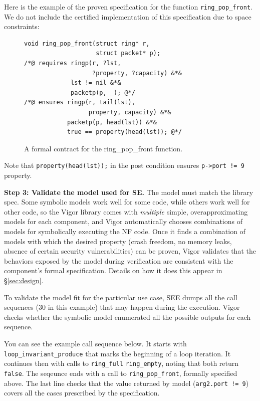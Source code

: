 \documentclass[letterpaper,twocolumn,10pt]{article}
\newcommand{\code}[1]{\lstinline{#1}}
\begin{document}
Here is the example of the proven specification for the function
\code{ring_pop_front}. We do not include the certified implementation of this
specification due to space constraints:

\begin{figure}[h!]
\begin{lstlisting}
void ring_pop_front(struct ring* r,
                    struct packet* p);
/*@ requires ringp(r, ?lst,
                   ?property, ?capacity) &*&
             lst != nil &*&
             packetp(p, _); @*/
/*@ ensures ringp(r, tail(lst),
                  property, capacity) &*&
            packetp(p, head(lst)) &*&
            true == property(head(lst)); @*/
\end{lstlisting}
  \caption{A formal contract for the ring\_pop\_front function.}
  \label{lst:contract}
\end{figure}

Note that \code{property(head(lst));} in the post condition ensures
\code{p->port != 9} property.

{\bf Step 3: Validate the model used for SE.} The model must match the library
spec. Some symbolic models work well for some code, while others work well for
other code, so the Vigor library comes with {\em multiple} simple,
overapproximating models for each component, and Vigor automatically chooses
combinations of models for symbolically executing the NF code. Once it finds a
combination of models with which the desired property (crash freedom, no memory
leaks, absence of certain security vulnerabilities) can be proven, Vigor
validates that the behaviors exposed by the model during verification are
consistent with the component's formal specification. Details on how it does
this appear in \S\ref{sec:design}.

To validate the model fit for the particular use case, SEE dumps
all the call sequences (30 in this example) that may happen during the execution.
Vigor checks whether the symbolic model enumerated all the possible
outputs for each sequence.

You can see the example call sequence below. It starts with
\code{loop_invariant_produce} that marks the beginning of a loop iteration. It
continues then with calls to \code{ring_full} \code{ring_empty}, noting that
both return \code{false}. The seqeunce ends with a call to
\code{ring_pop_front}, formally specified above. The last line checks that the
value returned by model (\code{arg2.port != 9}) covers all the cases prescribed
by the specification.
 
\end{document}
